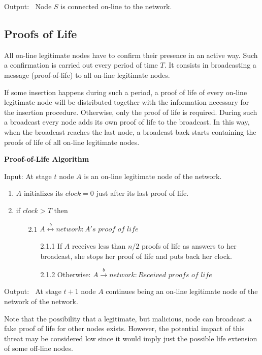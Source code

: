 \documentclass{article}
\begin{document}
Output: $\ $ Node $S$ is connected on-line to the network.


\subsection{Proofs of Life}

All on-line legitimate nodes have to confirm their presence in an active way. Such a confirmation is carried out every period of time $T$. It consists in broadcasting a message (proof-of-life) to all on-line legitimate nodes.

If some insertion happens during such a period, a proof of life of every on-line legitimate node will be distributed together with the information necessary for the insertion procedure. Otherwise, only the proof of life is required. During such a broadcast every node adds its own proof of life to the broadcast. In this way, when the broadcast reaches the last node, a broadcast back starts containing the proofs of life of all on-line legitimate nodes.

{\bf Proof-of-Life Algorithm}

Input: At stage $t$ node $A$ is an on-line legitimate node of the
network.
\begin{enumerate}
    \item  $A$ initializes its $clock=0$ just after its last proof of
    life.
    \item  if $clock > T$ then
    \begin{itemize}
        \item [2.1] $ A \stackrel{b}{\leftrightarrow} network: A's$ $ proof$ $of$ $life$
        \begin {itemize}
               \item [2.1.1] If $A$ receives less than $n/2$ proofs of life as answers to her broadcast, she stops 									her proof of life and puts back her clock.
      					\item [2.1.2] Otherwise: $ A \stackrel{b}{\rightarrow} network: Received$ $proofs$ $of$ $life$
				\end {itemize}    
    \end{itemize}
\end{enumerate}

Output: $\ $ At stage $t+1$ node $A$ continues being an on-line
legitimate node of the network of the network.

Note that the possibility that a legitimate, but malicious, node can broadcast a fake proof of life for other nodes exists.  However, the potential impact of this threat may be considered low since it would imply just the possible life extension of some off-line nodes.
\end{document}
